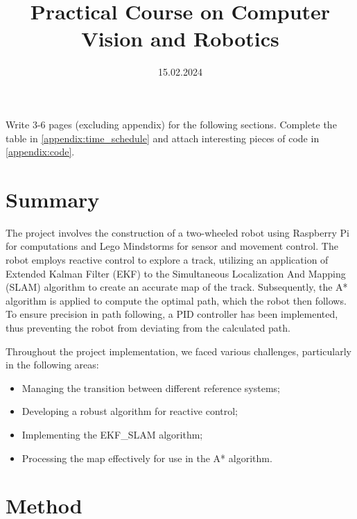 \documentclass[
	12pt,
]{sty/report_style}
\title{Practical Course on Computer Vision and Robotics} %
\date{15.02.2024} %
\institute{Georg-August-Universität Göttingen \\ Drittes Physikalisches Institut} %
\begin{document}
\maketitle

\begin{problem}
    Write 3-6 pages (excluding appendix) for the following sections. Complete the table in \cref{appendix:time_schedule} and attach interesting pieces of code in \cref{appendix:code}.
\end{problem}

\section{Summary}


The project involves the construction of a two-wheeled robot using Raspberry Pi for computations and Lego Mindstorms for sensor and movement control. The robot employs reactive control to explore a track, utilizing an application of Extended Kalman Filter (EKF) to the Simultaneous Localization And Mapping (SLAM) algorithm to create an accurate map of the track. Subsequently, the A* algorithm is applied to compute the optimal path, which the robot then follows. To ensure precision in path following, a PID controller has been implemented, thus preventing the robot from deviating from the calculated path.

Throughout the project implementation, we faced various challenges, particularly in the following areas:
\begin{itemize}
    \item Managing the transition between different reference systems;
    \item Developing a robust algorithm for reactive control;
    \item Implementing the EKF\_SLAM algorithm;
    \item Processing the map effectively for use in the A* algorithm.
\end{itemize}

\section{Method}

\end{document}
